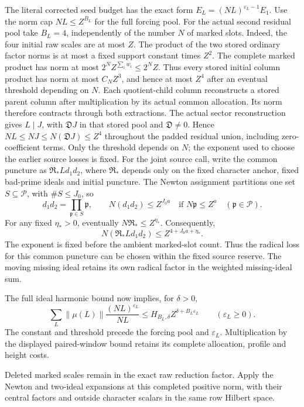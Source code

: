The literal corrected seed budget has the exact form
\(E_L=(NL)^{\varepsilon_L-1}E_1\).
Use the norm cap \(NL\le Z^{B_L}\) for the full forcing pool.
For the actual second residual pool take \(B_L=4\), independently
of the number \(N\) of marked slots. Indeed, the four initial raw
scales are at most \(Z\). The product of the two stored ordinary
factor norms is at most a fixed support constant times \(Z^2\).
The complete marked product has norm at most
\(2^N Z^{\sum_i w_i}\le2^N Z\).
Thus every stored initial column product has norm at most
\(C_NZ^3\), and hence at most \(Z^4\) after an eventual threshold
depending on \(N\). Each quotient-child column reconstructs a stored
parent column after multiplication by its actual common allocation.
Its norm therefore contracts through both extractions. The actual
sector reconstruction gives \(L\mid J\), with \(\mathfrak D J\)
in that stored pool and \(\mathfrak D\ne0\). Hence
\(NL\le NJ\le N(\mathfrak D J)\le Z^4\) throughout the padded
residual union, including zero-coefficient terms. Only the threshold depends on \(N\); the
exponent used to choose the earlier source losses is fixed.
For the joint source call, write the common puncture as
\(\mathfrak R_*L d_1d_2\), where \(\mathfrak R_*\) depends only
on the fixed character anchor, fixed bad-prime ideals and initial
puncture. The Newton assignment partitions one set
\(S\subseteq\mathcal P\), with \(\#S\le J_0\), so
\[
 d_1d_2=\prod_{\mathfrak p\in S}\mathfrak p,
 \qquad N(d_1d_2)\le Z^{J_0a}
 \quad\text{if }N\mathfrak p\le Z^a\quad(\mathfrak p\in\mathcal P).
\]
For any fixed \(\eta_*>0\), eventually
\(N\mathfrak R_*\le Z^{\eta_*}\). Consequently,
\[
 N(\mathfrak R_*L d_1d_2)\le Z^{4+J_0a+\eta_*}.
\]
The exponent is fixed before the ambient marked-slot count. Thus the
radical loss for this common puncture can be chosen within the fixed
source reserve. The moving missing ideal retains its own radical factor
in the weighted missing-ideal sum.

The full ideal harmonic bound now implies, for \(\delta>0\),
\[
 \sum_L\lVert\mu(L)\rVert\frac{(NL)^{\varepsilon_L}}{NL}
 \le H_{B_L,\delta}Z^{\delta+B_L\varepsilon_L}
 \qquad(\varepsilon_L\ge0).
\]
The constant and threshold precede the forcing pool and
\(\varepsilon_L\). Multiplication by the displayed paired-window
bound retains its complete allocation, profile and height costs.

Deleted marked scales remain in the exact raw
reduction factor. Apply the Newton and two-ideal expansions at this
completed positive norm, with their central factors and outside
character scalars in the same row Hilbert space.


